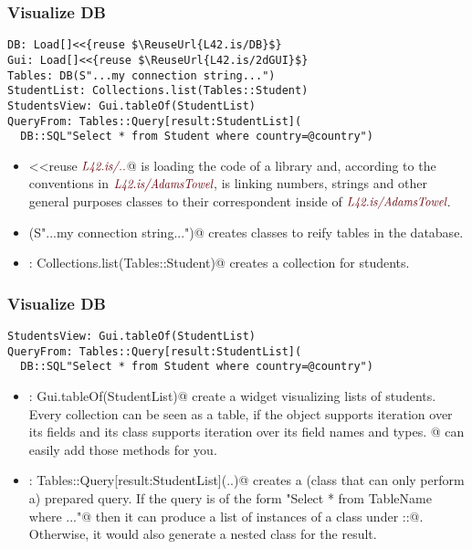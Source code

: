 \begin{frame}[fragile]
\frametitle{Visualize DB}
\begin{NiceCode}{59ex}{1}
\begin{lstlisting}
DB: Load[]<<{reuse $\ReuseUrl{L42.is/DB}$}
Gui: Load[]<<{reuse $\ReuseUrl{L42.is/2dGUI}$}
Tables: DB(S"...my connection string...")
StudentList: Collections.list(Tables::Student)
StudentsView: Gui.tableOf(StudentList)
QueryFrom: Tables::Query[result:StudentList](
  DB::SQL"Select * from Student where country=@country")
\end{lstlisting}
\end{NiceCode}
\begin{itemize}
\item \Q@Load[]<<{reuse $\ReuseUrl{L42.is/..}$}@
\Q@Load@ is loading the code of a library
and, according to the conventions in 
$\ReuseUrl{L42.is/AdamsTowel}$, is linking numbers, strings
and other general purposes classes to their correspondent 
inside of $\ReuseUrl{L42.is/AdamsTowel}$.
\item \Q@DB(S"...my connection string...")@
creates classes to reify tables in the database.
\item \Q@StudentList: Collections.list(Tables::Student)@
creates a collection for students.
\end{itemize}
\end{frame}


\begin{frame}[fragile]
\frametitle{Visualize DB}
\begin{NiceCode}{59ex}{1}
\begin{lstlisting}
StudentsView: Gui.tableOf(StudentList)
QueryFrom: Tables::Query[result:StudentList](
  DB::SQL"Select * from Student where country=@country")
\end{lstlisting}
\end{NiceCode}
\begin{itemize}
\item \Q@StudentsView: Gui.tableOf(StudentList)@
create a widget visualizing lists of students.
Every collection can be seen as a table, if the object supports
iteration over its fields and its class supports iteration over its field names and types.
\Q@Data[]@ can easily add those methods for you.
\item \Q@QueryFrom: Tables::Query[result:StudentList](..)@
creates a (class that can only perform a) prepared query.
If the query is of the form \Q@"Select * from TableName where ..."@ then
it can produce a list of instances of a class under \Q@Table::@.
Otherwise, it would also generate a nested class for the result.
\end{itemize}
\end{frame}


